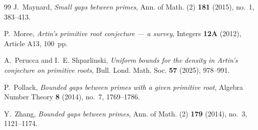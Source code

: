 \documentclass[11pt]{amsart}
\theoremstyle{definition}
\begin{document}
\begin{thebibliography}{99}
	J.~Maynard,
	\emph{Small gaps between primes},
	Ann. of Math. (2) \textbf{181} (2015), no.~1, 383--413.

	P.~Moree,
	\emph{Artin's primitive root conjecture --- a survey},
	Integers \textbf{12A} (2012), Article A13, 100~pp.

	A.~Perucca and I.~E. Shparlinski,
	\emph{Uniform bounds for the density in Artin's conjecture on primitive roots},
	Bull. Lond. Math. Soc. \textbf{57} (2025), 978--991.

	P.~Pollack,
	\emph{Bounded gaps between primes with a given primitive root},
	Algebra Number Theory \textbf{8} (2014), no.~7, 1769--1786.

	Y.~Zhang,
	\emph{Bounded gaps between primes},
	Ann. of Math. (2) \textbf{179} (2014), no.~3, 1121--1174.

\end{thebibliography}
\end{document}
